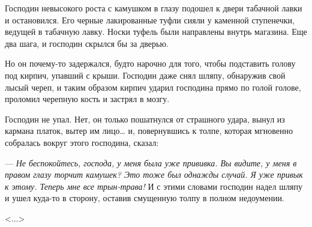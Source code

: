 Господин невысокого роста с камушком в глазу подошел к двери табачной лавки и остановился. Его черные лакированные туфли сияли у каменной ступенечки, ведущей в табачную лавку. Носки туфель были направлены внутрь магазина. Еще два шага, и господин скрылся бы за дверью.

Но он почему-то задержался, будто нарочно для того, чтобы подставить голову под кирпич, упавший с крыши. Господин даже снял шляпу, обнаружив свой лысый череп, и таким образом кирпич ударил господина прямо по голой голове, проломил черепную кость и застрял в мозгу.

Господин не упал. Нет, он только пошатнулся от страшного удара, вынул из кармана платок, вытер им лицо\dots{} и, повернувшись к толпе, которая мгновенно собралась вокруг этого господина, сказал:

--- \textit{Не беспокойтесь, господа, у меня была уже прививка. Вы видите, у меня в правом глазу торчит камушек? Это тоже был однажды случай. Я уже привык к этому. Теперь мне все трын-трава!} И с этими словами господин надел шляпу и ушел куда-то в сторону, оставив смущенную толпу в полном недоумении.

\vspace{1em}
\hfill <...>